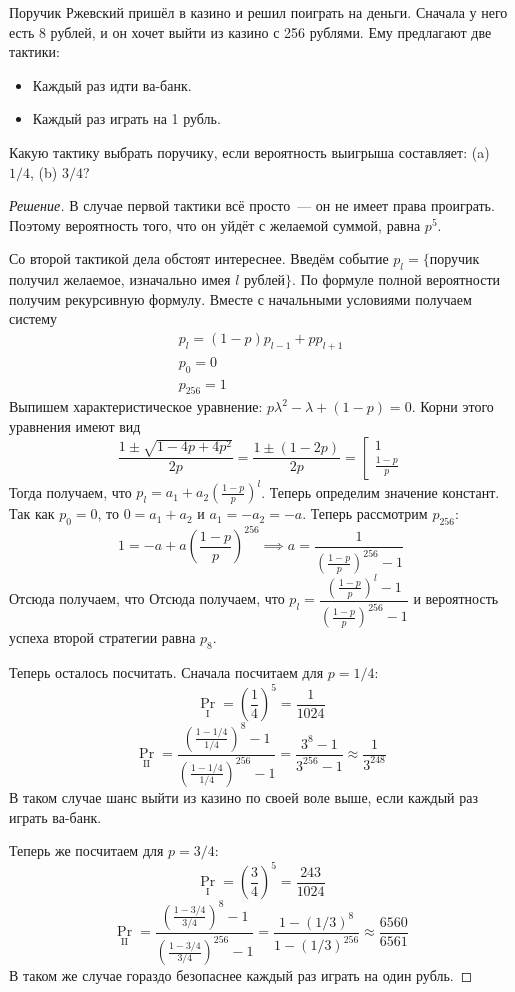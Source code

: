 \begin{problem}
    Поручик Ржевский пришёл в казино и решил поиграть на деньги. Сначала у него есть 8 рублей, и он хочет выйти из казино с 256 рублями. Ему предлагают две тактики:
    \begin{itemize}
        \item Каждый раз идти ва-банк.
        \item Каждый раз играть на 1 рубль.
    \end{itemize}
    Какую тактику выбрать поручику, если вероятность выигрыша составляет: (a) \(1/4\), (b) \(3/4\)?
\end{problem}
\begin{proof}[Решение]
    В случае первой тактики всё просто~--- он не имеет права проиграть. Поэтому вероятность того, что он уйдёт с желаемой суммой, равна \(p^5\).
    
    Со второй тактикой дела обстоят интереснее. Введём событие \(p_{l} = \{\)поручик получил желаемое, изначально имея \(l\) рублей\(\}\). По формуле полной вероятности получим рекурсивную формулу. Вместе с начальными условиями получаем систему
    \[\begin{array}{l}
    p_{l} = (1 - p)p_{l - 1} + pp_{l + 1} \\
    p_{0} = 0 \\
    p_{256} = 1
    \end{array}\]
    Выпишем характеристическое уравнение: \(p\lambda^2 - \lambda + (1 - p) = 0\). Корни этого уравнения имеют вид \[\frac{1 \pm \sqrt{1 - 4p + 4p^2}}{2p} = \frac{1 \pm (1 - 2p)}{2p} = \left[\begin{array}{l}
    1 \\ \frac{1 - p}{p}
    \end{array}\right.\]
    Тогда получаем, что \(p_{l} = a_1 + a_2\left(\frac{1 - p}{p}\right)^{l}\). Теперь определим значение констант. Так как \(p_0 = 0\), то \(0 = a_1 + a_2\) и \(a_1 = -a_2 = -a\). Теперь рассмотрим \(p_{256}\):
    \[1 = -a + a\left(\frac{1 - p}{p}\right)^{256} \implies a = \frac{1}{\left(\frac{1 - p}{p}\right)^{256} - 1}\]
    Отсюда получаем, что Отсюда получаем, что \(p_{l} = \dfrac{\left(\frac{1 - p}{p}\right)^{l} - 1}{\left(\frac{1 - p}{p}\right)^{256} - 1}\) и вероятность успеха второй стратегии равна \(p_8\).
    
    Теперь осталось посчитать. Сначала посчитаем для \(p = 1/4\):
    \[\Pr_{\text{I}} = \left(\frac{1}{4}\right)^5 = \frac{1}{1024}\]
    \[\Pr_{\text{II}} = \frac{\left(\frac{1 - 1/4}{1/4}\right)^{8} - 1}{\left(\frac{1 - 1/4}{1/4}\right)^{256} - 1} = \frac{3^8 - 1}{3^{256} - 1} \approx \frac{1}{3^{248}}\]
    В таком случае шанс выйти из казино по своей воле выше, если каждый раз играть ва-банк.
    
    Теперь же посчитаем для \(p = 3/4\):
    \[\Pr_{\text{I}} = \left(\frac{3}{4}\right)^5 = \frac{243}{1024}\]
    \[\Pr_{\text{II}} = \frac{\left(\frac{1 - 3/4}{3/4}\right)^{8} - 1}{\left(\frac{1 - 3/4}{3/4}\right)^{256} - 1} = \frac{1 - (1/3)^{8}}{1 - (1/3)^{256}} \approx \frac{6560}{6561}\]
    В таком же случае гораздо безопаснее каждый раз играть на один рубль.
\end{proof}

